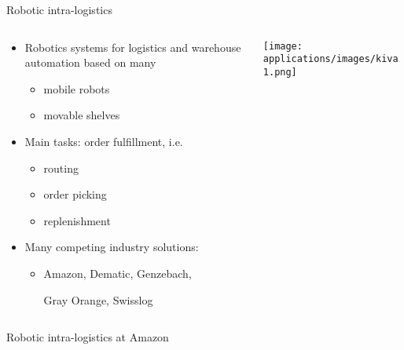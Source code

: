 \begin{frame}{Robotic intra-logistics}
  \begin{columns}
    \begin{column}{0.69\textwidth}
      \begin{itemize}
      \item \alert{Robotics systems} for \alert{logistics} and \alert{warehouse automation}
        based on many
        \begin{itemize}
        \item mobile robots
        \item movable shelves
        \end{itemize}
        \smallskip
      \item Main tasks: \alert{order fulfillment}, i.e.
        \begin{itemize}
        \item routing
        \item order picking
        \item replenishment
        \end{itemize} %
        \smallskip
      \item Many competing \alert{industry solutions}:
        \begin{itemize}
        \item
          Amazon,
          Dematic,
          Genzebach,\par
          Gray Orange,
          Swisslog
        \end{itemize}
      \end{itemize}
    \end{column}
    \begin{column}{0.35\textwidth}  %
      \begin{center}
        \texttt{[image: applications/images/kiva1.png]}
      \end{center}
    \end{column}
  \end{columns}
\end{frame}
\begin{frame}[c]{Robotic intra-logistics at Amazon}
  \begin{center}
  \end{center}
\end{frame}

